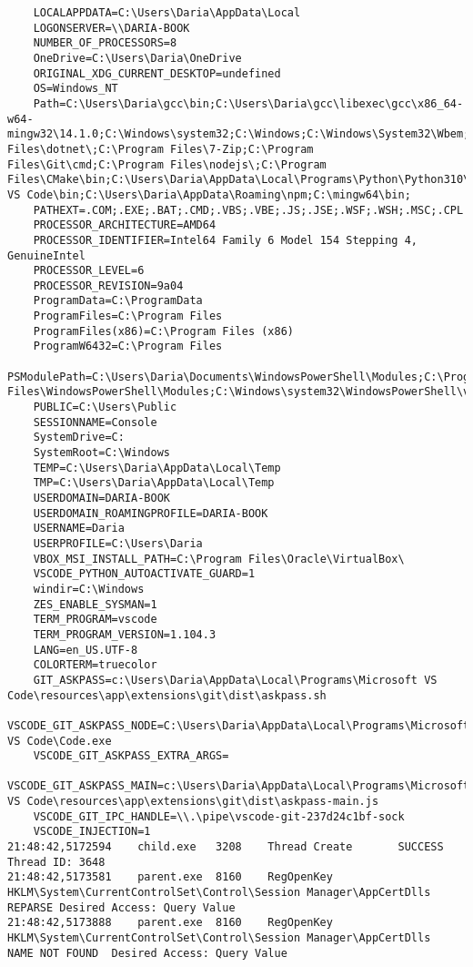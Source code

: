 \begin{verbatim}
	LOCALAPPDATA=C:\Users\Daria\AppData\Local
	LOGONSERVER=\\DARIA-BOOK
	NUMBER_OF_PROCESSORS=8
	OneDrive=C:\Users\Daria\OneDrive
	ORIGINAL_XDG_CURRENT_DESKTOP=undefined
	OS=Windows_NT
	Path=C:\Users\Daria\gcc\bin;C:\Users\Daria\gcc\libexec\gcc\x86_64-w64-mingw32\14.1.0;C:\Windows\system32;C:\Windows;C:\Windows\System32\Wbem;C:\Windows\System32\WindowsPowerShell\v1.0\;C:\Windows\System32\OpenSSH\;C:\Program Files\dotnet\;C:\Program Files\7-Zip;C:\Program Files\Git\cmd;C:\Program Files\nodejs\;C:\Program Files\CMake\bin;C:\Users\Daria\AppData\Local\Programs\Python\Python310\Scripts\;C:\Users\Daria\AppData\Local\Programs\Python\Python310\;C:\Users\Daria\AppData\Local\Microsoft\WindowsApps;C:\Users\Daria\AppData\Local\Programs\Microsoft VS Code\bin;C:\Users\Daria\AppData\Roaming\npm;C:\mingw64\bin;
	PATHEXT=.COM;.EXE;.BAT;.CMD;.VBS;.VBE;.JS;.JSE;.WSF;.WSH;.MSC;.CPL
	PROCESSOR_ARCHITECTURE=AMD64
	PROCESSOR_IDENTIFIER=Intel64 Family 6 Model 154 Stepping 4, GenuineIntel
	PROCESSOR_LEVEL=6
	PROCESSOR_REVISION=9a04
	ProgramData=C:\ProgramData
	ProgramFiles=C:\Program Files
	ProgramFiles(x86)=C:\Program Files (x86)
	ProgramW6432=C:\Program Files
	PSModulePath=C:\Users\Daria\Documents\WindowsPowerShell\Modules;C:\Program Files\WindowsPowerShell\Modules;C:\Windows\system32\WindowsPowerShell\v1.0\Modules
	PUBLIC=C:\Users\Public
	SESSIONNAME=Console
	SystemDrive=C:
	SystemRoot=C:\Windows
	TEMP=C:\Users\Daria\AppData\Local\Temp
	TMP=C:\Users\Daria\AppData\Local\Temp
	USERDOMAIN=DARIA-BOOK
	USERDOMAIN_ROAMINGPROFILE=DARIA-BOOK
	USERNAME=Daria
	USERPROFILE=C:\Users\Daria
	VBOX_MSI_INSTALL_PATH=C:\Program Files\Oracle\VirtualBox\
	VSCODE_PYTHON_AUTOACTIVATE_GUARD=1
	windir=C:\Windows
	ZES_ENABLE_SYSMAN=1
	TERM_PROGRAM=vscode
	TERM_PROGRAM_VERSION=1.104.3
	LANG=en_US.UTF-8
	COLORTERM=truecolor
	GIT_ASKPASS=c:\Users\Daria\AppData\Local\Programs\Microsoft VS Code\resources\app\extensions\git\dist\askpass.sh
	VSCODE_GIT_ASKPASS_NODE=C:\Users\Daria\AppData\Local\Programs\Microsoft VS Code\Code.exe
	VSCODE_GIT_ASKPASS_EXTRA_ARGS=
	VSCODE_GIT_ASKPASS_MAIN=c:\Users\Daria\AppData\Local\Programs\Microsoft VS Code\resources\app\extensions\git\dist\askpass-main.js
	VSCODE_GIT_IPC_HANDLE=\\.\pipe\vscode-git-237d24c1bf-sock
	VSCODE_INJECTION=1
21:48:42,5172594	child.exe	3208	Thread Create		SUCCESS	Thread ID: 3648
21:48:42,5173581	parent.exe	8160	RegOpenKey	HKLM\System\CurrentControlSet\Control\Session Manager\AppCertDlls	REPARSE	Desired Access: Query Value
21:48:42,5173888	parent.exe	8160	RegOpenKey	HKLM\System\CurrentControlSet\Control\Session Manager\AppCertDlls	NAME NOT FOUND	Desired Access: Query Value

\end{verbatim}
